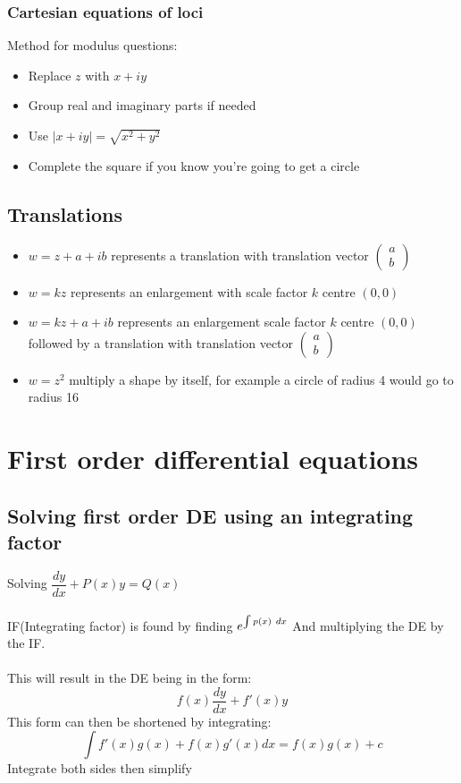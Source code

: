 \documentclass{article}[18pt]
\begin{document}
\subsubsection{Cartesian equations of loci}
Method for modulus questions:
\begin{itemize}
\item Replace $z$ with $x+iy$
\item Group real and imaginary parts if needed
\item Use $|x+iy|=\sqrt{x^2+y^2}$
\item Complete the square if you know you're going to get a circle
\end{itemize}

\subsection{Translations}
\begin{itemize}
\item $w=z+a+ib$ represents a translation with translation vector $\begin{pmatrix}
a\\b
\end{pmatrix}$
\item $w=kz$ represents an enlargement with scale factor $k$ centre $(0,0)$
\item $w=kz+a+ib$ represents an enlargement scale factor $k$ centre $(0,0)$ followed by a translation with translation vector $\begin{pmatrix}
a\\b
\end{pmatrix}$
\item $w=z^2$ multiply a shape by itself, for example a circle of radius 4 would go to radius 16
\end{itemize}

\section{First order differential equations}
\subsection{Solving first order DE using an integrating factor}
Solving $\dfrac{dy}{dx}+P(x)y=Q(x)$\\
\\
IF(Integrating factor) is found by finding $\mathlarger{e^{\int p(x) \ dx}}$ And multiplying the DE by the IF.\\
\\
This will result in the DE being in the form:
$$f(x)\frac{dy}{dx}+f'(x)y$$
This form can then be shortened by integrating:
$$\int f'(x)g(x)+f(x)g'(x) dx=f(x)g(x)+c$$
Integrate both sides then simplify
\end{document}
